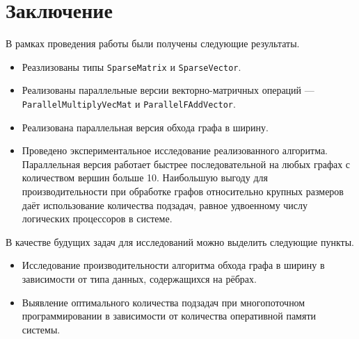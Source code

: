 
\section*{Заключение}
В рамках проведения работы были получены следующие результаты.

\begin{itemize}
\item Реазлизованы типы \texttt{SparseMatrix} и \texttt{SparseVector}.
\item Реализованы параллельные версии векторно-матричных операций --- \texttt{ParallelMultiplyVecMat} и \texttt{ParallelFAddVector}.
\item Реализована параллельная версия обхода графа в ширину.
\item Проведено экспериментальное исследование реализованного алгоритма. Параллельная версия работает быстрее последовательной на любых графах с количеством вершин больше 10. Наибольшую выгоду для производительности при обработке графов относительно крупных размеров даёт использование количества подзадач, равное удвоенному числу логических процессоров в системе.
\end{itemize}
\noindent В качестве будущих задач для исследований можно выделить следующие пункты.
\begin{itemize}
\item Исследование производительности алгоритма обхода графа в ширину в зависимости от типа данных, содержащихся на рёбрах.
\item Выявление оптимального количества подзадач при многопоточном программировании в зависимости от количества оперативной памяти системы.
\end{itemize}

